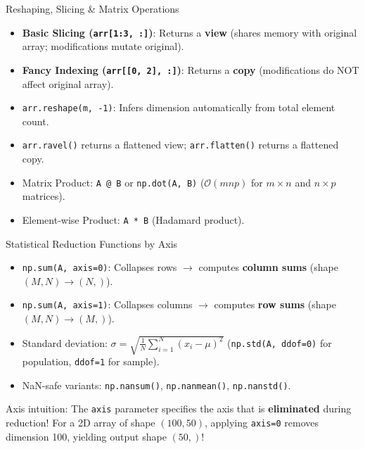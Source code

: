 \begin{formulabox}{Reshaping, Slicing \& Matrix Operations}
\begin{itemize}[leftmargin=1.5em, itemsep=2pt]
    \item \textbf{Basic Slicing (\texttt{arr[1:3, :]})}: Returns a \textbf{view} (shares memory with original array; modifications mutate original).
    \item \textbf{Fancy Indexing (\texttt{arr[[0, 2], :]})}: Returns a \textbf{copy} (modifications do NOT affect original array).
    \item \texttt{arr.reshape(m, -1)}: Infers dimension automatically from total element count.
    \item \texttt{arr.ravel()} returns a flattened view; \texttt{arr.flatten()} returns a flattened copy.
    \item Matrix Product: \texttt{A @ B} or \texttt{np.dot(A, B)} ($\mathcal{O}(m n p)$ for $m \times n$ and $n \times p$ matrices).
    \item Element-wise Product: \texttt{A * B} (Hadamard product).
\end{itemize}
\end{formulabox}

\begin{formulabox}{Statistical Reduction Functions by Axis}
\begin{itemize}[leftmargin=1.5em, itemsep=2pt]
    \item \texttt{np.sum(A, axis=0)}: Collapses rows $\to$ computes \textbf{column sums} (shape $(M, N) \to (N,)$).
    \item \texttt{np.sum(A, axis=1)}: Collapses columns $\to$ computes \textbf{row sums} (shape $(M, N) \to (M,)$).
    \item Standard deviation: $\sigma = \sqrt{\frac{1}{N} \sum_{i=1}^N (x_i - \mu)^2}$ (\texttt{np.std(A, ddof=0)} for population, \texttt{ddof=1} for sample).
    \item NaN-safe variants: \texttt{np.nansum()}, \texttt{np.nanmean()}, \texttt{np.nanstd()}.
\end{itemize}
\end{formulabox}

\begin{memorytip}
Axis intuition: The \texttt{axis} parameter specifies the axis that is \textbf{eliminated} during reduction! For a 2D array of shape $(100, 50)$, applying \texttt{axis=0} removes dimension 100, yielding output shape $(50,)$!
\end{memorytip}
